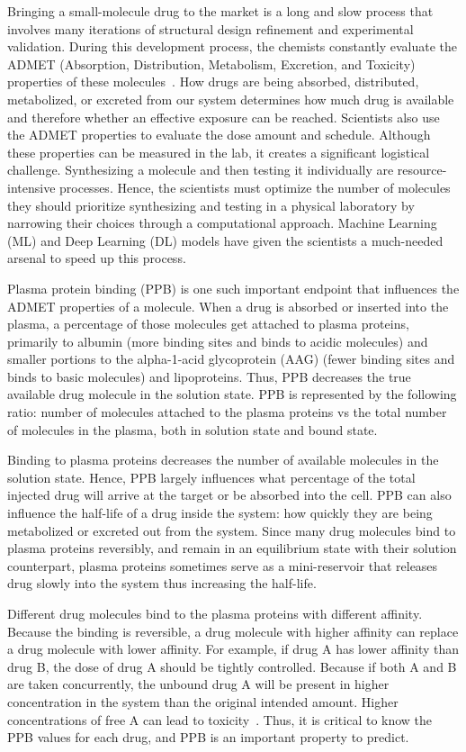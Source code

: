 \documentclass[11pt,a4paper]{article}
\begin{document}
Bringing a small-molecule drug to the market is a long and slow process that involves many iterations of structural design refinement and experimental validation.
During this development process, the chemists constantly evaluate the ADMET (Absorption, Distribution, Metabolism, Excretion, and Toxicity) properties of these molecules~\cite{bohnert2013ppb}.
How drugs are being absorbed, distributed, metabolized, or excreted from our system determines how much drug is available and therefore whether an effective exposure can be reached.
Scientists also use the ADMET properties to evaluate the dose amount and schedule.
Although these properties can be measured in the lab, it creates a significant logistical challenge.
Synthesizing a molecule and then testing it individually are resource-intensive processes.
Hence, the scientists must optimize the number of molecules they should prioritize synthesizing and testing in a physical laboratory by narrowing their choices through a computational approach.
Machine Learning (ML) and Deep Learning (DL) models have given the scientists a much-needed arsenal to speed up this process.

Plasma protein binding (PPB) is one such important endpoint that influences the ADMET properties of a molecule.
When a drug is absorbed or inserted into the plasma, a percentage of those molecules get attached to plasma proteins, primarily to albumin (more binding sites and binds to acidic molecules) and smaller portions to the alpha-1-acid glycoprotein (AAG) (fewer binding sites and binds to basic molecules) and lipoproteins.
Thus, PPB decreases the true available drug molecule in the solution state.
PPB is represented by the following ratio: number of molecules attached to the plasma proteins vs the total number of molecules in the plasma, both in solution state and bound state.

Binding to plasma proteins decreases the number of available molecules in the solution state.
Hence, PPB largely influences what percentage of the total injected drug will arrive at the target or be absorbed into the cell.
PPB can also influence the half-life of a drug inside the system: how quickly they are being metabolized or excreted out from the system.
Since many drug molecules bind to plasma proteins reversibly, and remain in an equilibrium state with their solution counterpart, plasma proteins sometimes serve as a mini-reservoir that releases drug slowly into the system thus increasing the half-life.

Different drug molecules bind to the plasma proteins with different affinity.
Because the binding is reversible, a drug molecule with higher affinity can replace a drug molecule with lower affinity.
For example, if drug A has lower affinity than drug B, the dose of drug A should be tightly controlled.
Because if both A and B are taken concurrently, the unbound drug A will be present in higher concentration in the system than the original intended amount.
Higher concentrations of free A can lead to toxicity~\cite{bohnert2013ppb}.
Thus, it is critical to know the PPB values for each drug, and PPB is an important property to predict.
\end{document}
